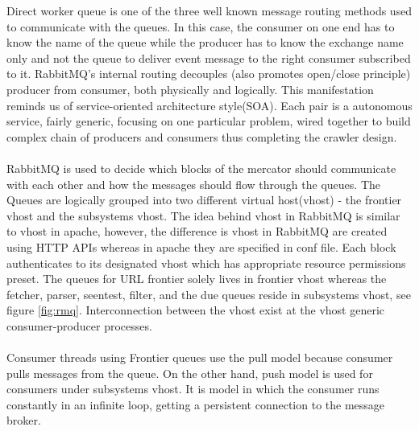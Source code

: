 \noindent
Direct worker queue is one of the three well known message routing methods used to communicate with the
queues. In this case, the consumer on one end has to know the name of the queue while the producer has to know the exchange name only and not the queue to deliver event message to the right consumer subscribed to it.
RabbitMQ's internal routing decouples (also promotes open/close principle) producer from consumer, both physically and logically. This manifestation reminds us of service-oriented architecture style(SOA). Each
pair is a autonomous service, fairly generic, focusing on one particular problem, wired together to build complex chain of producers and consumers thus completing the crawler design.
\\
\\
\noindent
RabbitMQ is used to decide which blocks of the mercator should communicate with each other and how the
messages should flow through the queues. The Queues are logically grouped into two different virtual
host(vhost) - the frontier vhost and the subsystems vhost. The idea behind vhost in RabbitMQ is similar
to vhost in apache, however, the difference is vhost in RabbitMQ are created using HTTP APIs whereas
in apache they are specified in conf file. Each block authenticates to its designated vhost which has
appropriate resource permissions preset. The queues for URL frontier solely lives in frontier vhost
whereas the fetcher, parser, seentest, filter, and the due queues reside in subsystems vhost, see figure
\ref{fig:rmq}. Interconnection between the vhost exist at the vhost generic consumer-producer processes.
\\
\\
\noindent
Consumer threads using Frontier queues use the pull model because consumer pulls messages from the queue.
On the other hand, push model is used for consumers under subsystems vhost. It is model in which the
consumer runs constantly in an infinite loop, getting a persistent connection to the message broker.

\pagebreak

